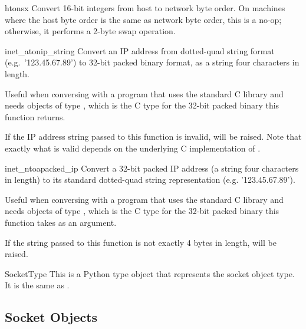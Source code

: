\begin{funcdesc}{htons}{x}
Convert 16-bit integers from host to network byte order.  On machines
where the host byte order is the same as network byte order, this is a
no-op; otherwise, it performs a 2-byte swap operation.
\end{funcdesc}

\begin{funcdesc}{inet_aton}{ip_string}
Convert an IP address from dotted-quad string format
(e.g.\ '123.45.67.89') to 32-bit packed binary format, as a string four
characters in length.

Useful when conversing with a program that uses the standard C library
and needs objects of type , which is the C type
for the 32-bit packed binary this function returns.

If the IP address string passed to this function is invalid,
 will be raised. Note that exactly what is
valid depends on the underlying C implementation of
.
\end{funcdesc}

\begin{funcdesc}{inet_ntoa}{packed_ip}
Convert a 32-bit packed IP address (a string four characters in
length) to its standard dotted-quad string representation
(e.g. '123.45.67.89').

Useful when conversing with a program that uses the standard C library
and needs objects of type , which is the C type
for the 32-bit packed binary this function takes as an argument.

If the string passed to this function is not exactly 4 bytes in
length,  will be raised.
\end{funcdesc}

\begin{datadesc}{SocketType}
This is a Python type object that represents the socket object type.
It is the same as .
\end{datadesc}


\begin{seealso}
\end{seealso}


\subsection{Socket Objects \label{socket-objects}}

